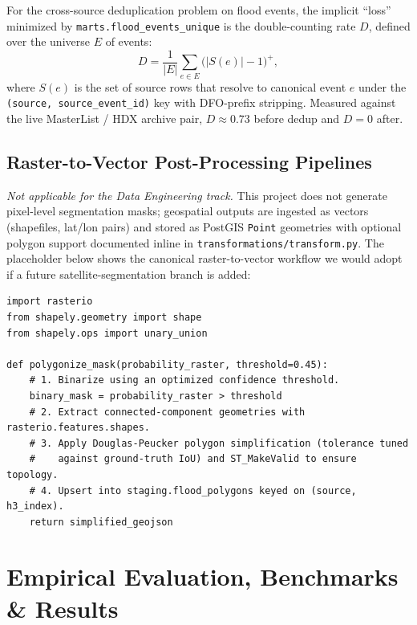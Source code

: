 \documentclass[11pt,a4paper]{article}
\begin{document}
For the cross-source deduplication problem on flood events, the implicit
``loss'' minimized by \texttt{marts.flood\_events\_unique} is the
double-counting rate $D$, defined over the universe $E$ of events:
\begin{equation}
    D = \frac{1}{|E|} \sum_{e \in E} \bigl(|S(e)| - 1\bigr)^{+},
\end{equation}
where $S(e)$ is the set of source rows that resolve to canonical event $e$
under the \texttt{(source, source\_event\_id)} key with DFO-prefix
stripping. Measured against the live MasterList / HDX archive pair,
$D \approx 0.73$ before dedup and $D = 0$ after.

\subsection{Raster-to-Vector Post-Processing Pipelines}

\textit{Not applicable for the Data Engineering track.} This project does
not generate pixel-level segmentation masks; geospatial outputs are
ingested as vectors (shapefiles, lat/lon pairs) and stored as PostGIS
\texttt{Point} geometries with optional polygon support documented inline
in \texttt{transformations/transform.py}. The placeholder below shows the
canonical raster-to-vector workflow we would adopt if a future
satellite-segmentation branch is added:

\begin{lstlisting}[caption={Vectorization and simplification workflow (placeholder for a
future segmentation branch).}]
import rasterio
from shapely.geometry import shape
from shapely.ops import unary_union

def polygonize_mask(probability_raster, threshold=0.45):
    # 1. Binarize using an optimized confidence threshold.
    binary_mask = probability_raster > threshold
    # 2. Extract connected-component geometries with rasterio.features.shapes.
    # 3. Apply Douglas-Peucker polygon simplification (tolerance tuned
    #    against ground-truth IoU) and ST_MakeValid to ensure topology.
    # 4. Upsert into staging.flood_polygons keyed on (source, h3_index).
    return simplified_geojson
\end{lstlisting}

\section{Empirical Evaluation, Benchmarks \& Results}
\end{document}
